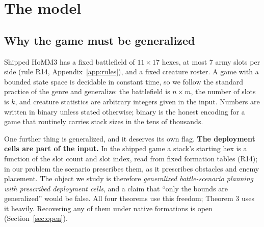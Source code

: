 \documentclass[11pt,a4paper]{article}
\theoremstyle{plain}
\theoremstyle{definition}
\theoremstyle{plain}
\theoremstyle{definition}
\theoremstyle{remark}
\begin{document}
\section{The model}\label{sec:model}

\subsection{Why the game must be generalized}\label{sec:generalized}

Shipped HoMM3 has a fixed battlefield of $11\times17$ hexes, at most 7 army slots per side
(rule R14, Appendix~\ref{app:rules}), and a fixed creature roster. A game with a bounded state
space is decidable in constant time, so we follow the standard practice of the genre and
generalize: the battlefield is $n\times m$, the number of slots is $k$, and creature
statistics are arbitrary integers given in the input. Numbers are written in binary unless
stated otherwise; binary is the honest encoding for a game that routinely carries stack sizes
in the tens of thousands.

One further thing is generalized, and it deserves its own flag. \textbf{The deployment cells
are part of the input.} In the shipped game a stack's starting hex is a function of the slot
count and slot index, read from fixed formation tables (R14); in our problem the scenario
prescribes them, as it prescribes obstacles and enemy placement. The object we study is
therefore \emph{generalized battle-scenario planning with prescribed deployment cells}, and a
claim that ``only the bounds are generalized'' would be false. All four theorems use this
freedom; Theorem 3 uses it heavily. Recovering any of them under native formations is open
(Section~\ref{sec:open}).
\end{document}
